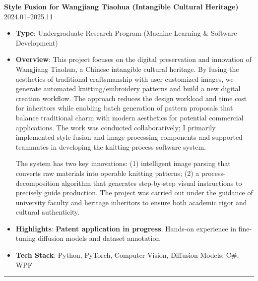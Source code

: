 \documentclass[11pt]{article}
\begin{document}
\textbf{\large \color{CVBlue} Style Fusion for Wangjiang Tiaohua (Intangible Cultural Heritage)} \hfill 2024.01--2025.11
\begin{itemize}
    \item \textbf{Type}: Undergraduate Research Program (Machine Learning \& Software Development)
    \item \textbf{Overview}: This project focuses on the digital preservation and innovation of Wangjiang Tiaohua, a Chinese intangible cultural heritage.
    By fusing the aesthetics of traditional craftsmanship with user-customized images, we generate automated knitting/embroidery patterns and build a new digital creation workflow.
    The approach reduces the design workload and time cost for inheritors while enabling batch generation of pattern proposals that balance traditional charm with modern aesthetics for potential commercial applications.
    The work was conducted collaboratively; I primarily implemented style fusion and image-processing components and supported teammates in developing the knitting-process software system.

    The system has two key innovations: (1) intelligent image parsing that converts raw materials into operable knitting patterns; (2) a process-decomposition algorithm that generates step-by-step visual instructions to precisely guide production.
    The project was carried out under the guidance of university faculty and heritage inheritors to ensure both academic rigor and cultural authenticity.

    \item[\textcolor{CVBlue}{\faStar}] \textbf{\textcolor{CVBlue}{Highlights}}: \textbf{Patent application in progress}; \quad Hands-on experience in fine-tuning diffusion models and dataset annotation
    \item \textbf{Tech Stack}: Python, PyTorch, Computer Vision, Diffusion Models; C\#, WPF
\end{itemize}

\par\noindent\textcolor{black!20}{\rule{\linewidth}{0.5pt}}

\vspace*{0.1em}
\end{document}
